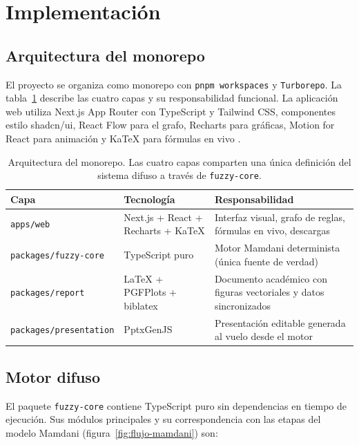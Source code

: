 \section{Implementación}

\subsection{Arquitectura del monorepo}

El proyecto se organiza como monorepo con \texttt{pnpm workspaces} y \texttt{Turborepo}. La tabla~\ref{tab:arquitectura} describe las cuatro capas y su responsabilidad funcional. La aplicación web utiliza Next.js App Router con TypeScript y Tailwind CSS, componentes estilo shadcn/ui, React Flow para el grafo, Recharts para gráficas, Motion for React para animación y KaTeX para fórmulas en vivo \citep{nextjs2026app,turborepo2026next,shadcn2026monorepo,reactflow2026overview,recharts2026docs,motion2026react,katex2026browser}.

\begin{table}[H]
  \centering
  \small
  \begin{tabularx}{0.96\linewidth}{l l X}
    \toprule
    \textbf{Capa} & \textbf{Tecnología} & \textbf{Responsabilidad}\\
    \midrule
    \texttt{apps/web} & Next.js + React + Recharts + KaTeX & Interfaz visual, grafo de reglas, fórmulas en vivo, descargas\\
    \texttt{packages/fuzzy-core} & TypeScript puro & Motor Mamdani determinista (única fuente de verdad)\\
    \texttt{packages/report} & LaTeX + PGFPlots + biblatex & Documento académico con figuras vectoriales y datos sincronizados\\
    \texttt{packages/presentation} & PptxGenJS & Presentación editable generada al vuelo desde el motor\\
    \bottomrule
  \end{tabularx}
  \caption{Arquitectura del monorepo. Las cuatro capas comparten una única definición del sistema difuso a través de \texttt{fuzzy-core}.}
  \label{tab:arquitectura}
\end{table}

\subsection{Motor difuso}

El paquete \texttt{fuzzy-core} contiene TypeScript puro sin dependencias en tiempo de ejecución. Sus módulos principales y su correspondencia con las etapas del modelo Mamdani (figura~\ref{fig:flujo-mamdani}) son:

